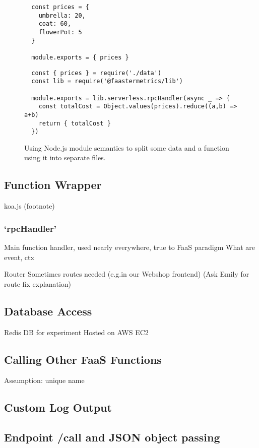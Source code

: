 \documentclass[../main.tex]{subfiles}
\begin{document}
\begin{figure}
\begin{tcolorbox}
  \begin{tcolorbox}[enhanced, title={\texttt{[\ldots]/exampleFunction/data.js}}, attach boxed title to bottom left]
  \begin{verbatim}
  const prices = {
    umbrella: 20,
    coat: 60,
    flowerPot: 5
  }

  module.exports = { prices }
  \end{verbatim}
  \end{tcolorbox}

  \begin{tcolorbox}[enhanced, title=\texttt{{[\ldots]/exampleFunction/index.js}}, attach boxed title to bottom left]
  \begin{verbatim}
  const { prices } = require('./data')
  const lib = require('@faastermetrics/lib')

  module.exports = lib.serverless.rpcHandler(async _ => {
    const totalCost = Object.values(prices).reduce((a,b) => a+b)
    return { totalCost }
  })
  \end{verbatim}
  \end{tcolorbox}

\end{tcolorbox}
\caption{Using Node.js module semantics to split some data and a function using it into separate files.}%
\label{fig:dividingDataAndFunctionCodeNodeJS}
\end{figure}

\subsection{Function Wrapper}
koa.js (footnote)

\subsubsection{`rpcHandler'}%
\label{ssub:rpcHandler}
Main function handler, used nearly everywhere, true to FaaS paradigm
What are event, ctx

Router
Sometimes routes needed (e.g.\@ in our Webshop frontend)
(Ask Emily for route fix explanation)

\subsection{Database Access}
Redis DB for experiment
Hosted on AWS EC2

\subsection{Calling Other FaaS Functions}
Assumption: unique name


\subsection{Custom Log Output}

\subsection{Endpoint /call and JSON object passing}
\end{document}
